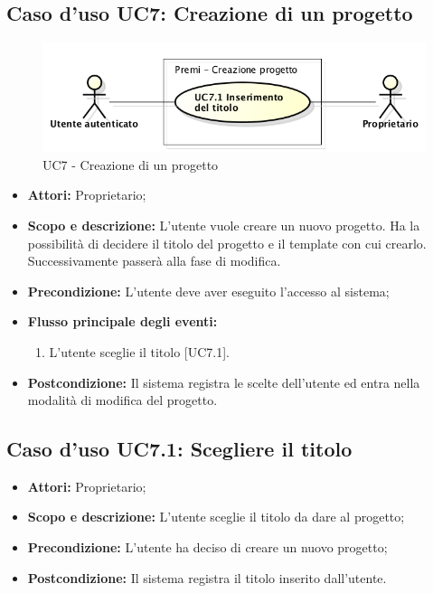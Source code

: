 \subsection{Caso d'uso UC7: Creazione di un progetto}
\begin{figure}[h] 
	\centering 
	\includegraphics[scale=0.45] {img/UC7.png}
	\caption{UC7 - Creazione di un progetto} 
\end{figure}

\begin{itemize}
	\item \textbf{Attori:} Proprietario;
	\item \textbf{Scopo e descrizione:} L'utente vuole creare un nuovo progetto. Ha la possibilità di decidere il titolo del progetto e il \gls{template} con cui crearlo. Successivamente passerà alla fase di modifica.
	\item \textbf{Precondizione:} L'utente deve aver eseguito l'accesso al sistema;
	\item \textbf{Flusso principale degli eventi:}
	\begin{enumerate}
		\item L'utente sceglie il titolo [UC7.1].
	\end{enumerate}
	\item \textbf{Postcondizione:} Il sistema registra le scelte dell'utente ed entra nella modalità di modifica del progetto.
\end{itemize}


\subsection{Caso d'uso UC7.1: Scegliere il titolo}
\begin{itemize}
	\item \textbf{Attori:} Proprietario;
	\item \textbf{Scopo e descrizione:} L'utente sceglie il titolo da dare al progetto;
	\item \textbf{Precondizione:} L'utente ha deciso di creare un nuovo progetto;
	\item \textbf{Postcondizione:} Il sistema registra il titolo inserito dall'utente.
\end{itemize}